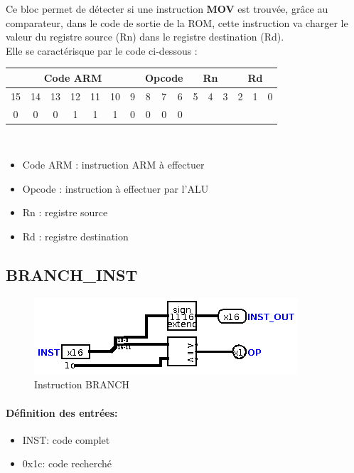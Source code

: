 \documentclass[a4paper]{article} %
\begin{document}
Ce bloc permet de détecter si une instruction \textbf{MOV} est trouvée, grâce au comparateur, dans le code de sortie de la ROM, cette instruction va charger le valeur du registre source (Rn) dans le registre destination (Rd).\\
Elle se caractérisque par le code ci-dessous : 
\\
\begin{tabular}{|ccccccc|ccc|ccc|ccc|}
    \hline
    \multicolumn{7}{|c|}{Code ARM}  & \multicolumn{3}{|c|}{Opcode} & \multicolumn{3}{|c|}{Rn} & \multicolumn{3}{|c|}{Rd}\\
    \hline
    15 & 14 & 13 & 12 & 11 & 10 & 9 & 8 & 7 & 6                    & 5 & 4 & 3                & 2 & 1 & 0 \\
    \hline
    0  & 0  & 0  & 1  & 1  & 1  & 0 & 0 & 0 & 0                    & \multicolumn{3}{|c|}{}   & \multicolumn{3}{|c|}{} \\
    \hline     
    \end{tabular}
\\
\begin{itemize}
    \item     Code ARM : instruction ARM à effectuer
    \item     Opcode : instruction à effectuer par l'ALU
    \item     Rn : registre source
    \item     Rd : registre destination
\end{itemize}


\subsection{BRANCH\_INST} \label{branchinst}
\begin{figure}[H]
    \centering
    \includegraphics[width=.8\textwidth]{src/BRANCH_INST.png}
    \caption{Instruction BRANCH}
    \label{branch}
\end{figure}

\paragraph{Définition des entrées:}
\begin{itemize}
    \item     INST: code complet
    \item     0x1c: code recherché
\end{itemize}
\end{document}
